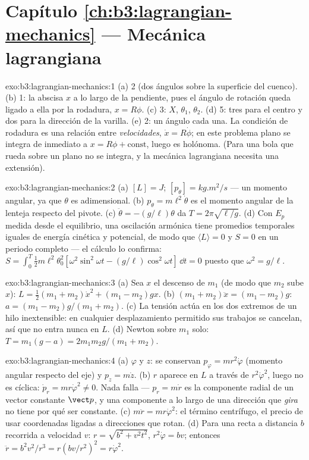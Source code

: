 \section*{Capítulo \ref{ch:b3:lagrangian-mechanics} --- Mecánica lagrangiana}

\begin{solution}{exo:b3:lagrangian-mechanics:1}
(a) 2 (dos ángulos sobre la superficie del cuenco). (b) 1: la abscisa $x$ a
lo largo de la pendiente, pues el ángulo de rotación queda ligado a ella por
la rodadura, $x =
R\phi$. (c) 3: $X$, $\theta_1$, $\theta_2$. (d) 5: tres para el centro y dos
para la dirección de la varilla. (e) 2: un ángulo cada una. La condición de
rodadura es una relación entre \emph{velocidades}, $\dot x =
R\dot\phi$; en este problema plano se integra de inmediato a $x = R\phi +
\text{const}$, luego es holónoma. (Para una bola que rueda sobre un plano no
se integra, y la mecánica lagrangiana necesita una extensión).
\end{solution}

\begin{solution}{exo:b3:lagrangian-mechanics:2}
(a) $[L] = \unit{J}$; $[p_\theta] = \unit{kg.m^2/s}$ --- un momento
angular, ya que $\theta$ es adimensional. (b) $p_\theta =
m\ell^2\dot\theta$ es el momento angular de la lenteja respecto del pivote.
(c) $\ddot\theta = -(g/\ell)\theta$ da $T = 2\pi\sqrt{\ell/g}$. (d) Con
$E_p$ medida desde el equilibrio, una oscilación armónica tiene promedios
temporales iguales de energía cinética y potencial, de modo que $\langle
L\rangle = 0$ y $S = 0$ en un periodo completo --- el cálculo lo confirma:
$S = \int_0^T\tfrac12 m\ell^2\theta_0^2[\omega^2\sin^2
\omega t - (g/\ell)\cos^2\omega t]\,\dd t = 0$ puesto que $\omega^2 =
g/\ell$.
\end{solution}

\begin{solution}{exo:b3:lagrangian-mechanics:3}
(a) Sea $x$ el descenso de $m_1$ (de modo que $m_2$ sube $x$): $L =
\tfrac12(m_1 + m_2)\dot x^2 + (m_1 - m_2)gx$. (b) $(m_1 + m_2)\ddot x =
(m_1 - m_2)g$: $a = (m_1 - m_2)g/(m_1 + m_2)$. (c) La tensión actúa en los
dos extremos de un hilo inextensible: en cualquier desplazamiento permitido
sus trabajos se cancelan, así que no entra nunca en $L$. (d) Newton sobre
$m_1$ solo: $T =
m_1(g - a) = 2m_1m_2g/(m_1 + m_2)$.
\end{solution}

\begin{solution}{exo:b3:lagrangian-mechanics:4}
(a) $\varphi$ y $z$: se conservan $p_\varphi = mr^2\dot\varphi$ (momento
angular respecto del eje) y $p_z = m\dot z$. (b) $r$ aparece en
$L$ a través de $r^2\dot\varphi^2$, luego no es cíclica: $\dot p_r =
mr\dot\varphi^2 \neq 0$. Nada falla --- $p_r = m\dot r$ es la componente
radial de un vector constante $\vect p$, y una componente a lo largo de una
dirección que \emph{gira} no tiene por qué ser constante. (c) $m\ddot r =
mr\dot\varphi^2$: el término centrífugo, el precio de usar coordenadas
ligadas a direcciones que rotan. (d) Para una recta a distancia $b$
recorrida a velocidad $v$: $r = \sqrt{b^2 + v^2t^2}$, $r^2\dot\varphi = bv$;
entonces $\ddot r = b^2v^2/r^3 = r(bv/r^2)^2 = r\dot\varphi^2$.
\end{solution}

